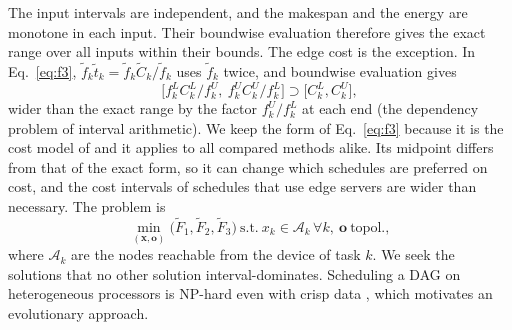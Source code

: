 The input intervals are independent, and the makespan and the energy are monotone in each input. Their boundwise
evaluation therefore gives the exact range over all inputs within their bounds. The edge cost is the exception. In
Eq.~\eqref{eq:f3}, $\tilde f_k \tilde t_k = \tilde f_k \tilde C_k / \tilde f_k$ uses $\tilde f_k$ twice, and boundwise
evaluation gives
\begin{equation*}
\big[f^L_k C^L_k / f^U_k,\ f^U_k C^U_k / f^L_k\big] \supset \big[C^L_k, C^U_k\big],
\end{equation*}
wider than the exact range by the factor $f^U_k / f^L_k$ at each end (the dependency problem of interval
arithmetic). We keep the form of Eq.~\eqref{eq:f3}
because it is the cost model of \citet{jin2026imoeadqn} and it applies to all compared methods alike. Its midpoint
differs from that of the exact form, so it can change which schedules are preferred on cost, and the cost intervals of
schedules that use edge servers are wider than necessary. The problem is
\begin{equation}
\min_{(\mathbf{x}, \mathbf{o})} \big(\tilde F_1, \tilde F_2, \tilde F_3\big)\ \text{s.t.}\ x_k \in \mathcal{A}_k\, \forall k,\
\mathbf{o}\ \text{topol.},
\label{eq:problem}
\end{equation}
where $\mathcal{A}_k$ are the nodes reachable from the device of task $k$. We seek the solutions that no other solution
interval-dominates. Scheduling a DAG on heterogeneous processors is NP-hard even with crisp data
\citep{topcuoglu2002heft}, which motivates an evolutionary approach.

